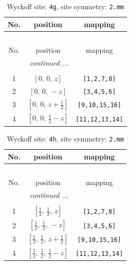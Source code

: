 \documentclass[fleqn,8pt]{jsarticle}
\begin{document}
\renewcommand{\arraystretch}{1.2}
\begin{longtable}{ccc}
\caption{Wyckoff site: {\tt 4g}, site symmetry: {\tt 2.mm}}
 \\
 \hline \hline
No. & position & mapping \\ \hline \endfirsthead

\multicolumn{2}{l}{\tablename\ \thetable{}} \\
 \hline \hline
No. & position & mapping \\ \hline \endhead

 \hline \hline
\multicolumn{2}{r}{\footnotesize\it continued ...} \\ \endfoot

 \hline \hline
\multicolumn{2}{r}{} \\ \endlastfoot

1 & $\left[ 0,\, 0,\, z \right]$ & {\tt [1,2,7,8]} \\ \hline
2 & $\left[ 0,\, 0,\, - z \right]$ & {\tt [3,4,5,6]} \\ \hline
3 & $\left[ 0,\, 0,\, z + \frac{1}{2} \right]$ & {\tt [9,10,15,16]} \\ \hline
4 & $\left[ 0,\, 0,\, \frac{1}{2} - z \right]$ & {\tt [11,12,13,14]} \\
\end{longtable}
\renewcommand{\arraystretch}{1.2}
\begin{longtable}{ccc}
\caption{Wyckoff site: {\tt 4h}, site symmetry: {\tt 2.mm}}
 \\
 \hline \hline
No. & position & mapping \\ \hline \endfirsthead

\multicolumn{2}{l}{\tablename\ \thetable{}} \\
 \hline \hline
No. & position & mapping \\ \hline \endhead

 \hline \hline
\multicolumn{2}{r}{\footnotesize\it continued ...} \\ \endfoot

 \hline \hline
\multicolumn{2}{r}{} \\ \endlastfoot

1 & $\left[ \frac{1}{2},\, \frac{1}{2},\, z \right]$ & {\tt [1,2,7,8]} \\ \hline
2 & $\left[ \frac{1}{2},\, \frac{1}{2},\, - z \right]$ & {\tt [3,4,5,6]} \\ \hline
3 & $\left[ \frac{1}{2},\, \frac{1}{2},\, z + \frac{1}{2} \right]$ & {\tt [9,10,15,16]} \\ \hline
4 & $\left[ \frac{1}{2},\, \frac{1}{2},\, \frac{1}{2} - z \right]$ & {\tt [11,12,13,14]} \\
\end{longtable}
\end{document}
